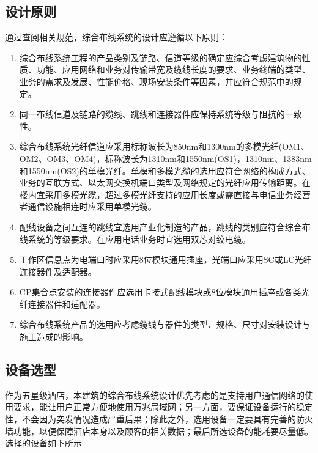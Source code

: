 \documentclass{gdutart}
\begin{document}
    \subsection{设计原则}
    通过查阅相关规范，综合布线系统的设计应遵循以下原则：
    \begin{enumerate}[label={(\arabic*)}]
      \item 综合布线系统工程的产品类别及链路、信道等级的确定应综合考虑建筑物的性质、功能、应用网络和业务对传输带宽及缆线长度的要求、业务终端的类型、业务的需求及发展、性能价格、现场安装条件等因素，并应符合规范\cite{s2}中的规定。
      \item 同一布线信道及链路的缆线、跳线和连接器件应保持系统等级与阻抗的一致性。
      \item 综合布线系统光纤信道应采用标称波长为850nm和1300nm的多模光纤(OM1、OM2、OM3、OM4)，标称波长为1310nm和1550nm(OS1)，1310nm、1383nm和1550nm(OS2)的单模光纤。单模和多模光缆的选用应符合网络的构成方式、业务的互联方式、以太网交换机端口类型及网络规定的光纤应用传输距离。在楼内宜采用多模光缆，超过多模光纤支持的应用长度或需直接与电信业务经营者通信设施相连时应采用单模光缆。
      \item 配线设备之间互连的跳线宜选用产业化制造的产品，跳线的类别应符合综合布线系统的等级要求。在应用电话业务时宜选用双芯对绞电缆。
      \item 工作区信息点为电端口时应采用8位模块通用插座，光端口应采用SC或LC光纤连接器件及适配器。
      \item CP集合点安装的连接器件应选用卡接式配线模块或8位模块通用插座或各类光纤连接器件和适配器。
      \item 综合布线系统产品的选用应考虑缆线与器件的类型、规格、尺寸对安装设计与施工造成的影响。
    \end{enumerate}

    \subsection{设备选型}
    作为五星级酒店，本建筑的综合布线系统设计优先考虑的是支持用户通信网络的使用要求，能让用户正常方便地使用万兆局域网；另一方面，要保证设备运行的稳定性，不会因为突发情况造成严重后果；除此之外，选用设备一定要具有完善的防火墙功能，以便保障酒店本身以及顾客的相关数据；最后所选设备的能耗要尽量低。选择的设备如下所示
\end{document}

